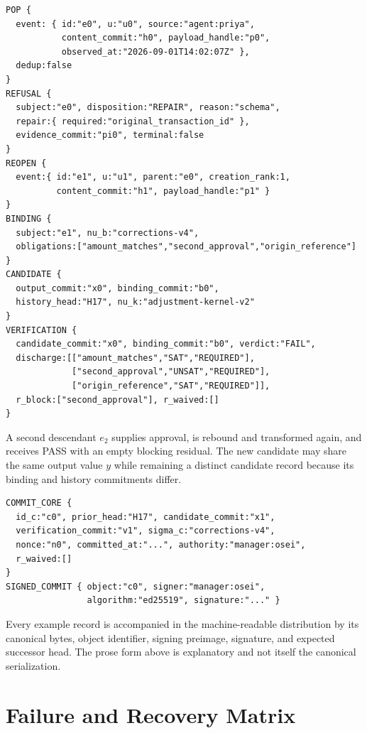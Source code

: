 \documentclass[11pt,openany]{book}
\begin{document}
\begin{scriptsize}
\begin{verbatim}
POP {
  event: { id:"e0", u:"u0", source:"agent:priya",
           content_commit:"h0", payload_handle:"p0",
           observed_at:"2026-09-01T14:02:07Z" },
  dedup:false
}
REFUSAL {
  subject:"e0", disposition:"REPAIR", reason:"schema",
  repair:{ required:"original_transaction_id" },
  evidence_commit:"pi0", terminal:false
}
REOPEN {
  event:{ id:"e1", u:"u1", parent:"e0", creation_rank:1,
          content_commit:"h1", payload_handle:"p1" }
}
BINDING {
  subject:"e1", nu_b:"corrections-v4",
  obligations:["amount_matches","second_approval","origin_reference"]
}
CANDIDATE {
  output_commit:"x0", binding_commit:"b0",
  history_head:"H17", nu_k:"adjustment-kernel-v2"
}
VERIFICATION {
  candidate_commit:"x0", binding_commit:"b0", verdict:"FAIL",
  discharge:[["amount_matches","SAT","REQUIRED"],
             ["second_approval","UNSAT","REQUIRED"],
             ["origin_reference","SAT","REQUIRED"]],
  r_block:["second_approval"], r_waived:[]
}
\end{verbatim}
\end{scriptsize}

A second descendant \(e_2\) supplies approval, is rebound and transformed
again, and receives PASS with an empty blocking residual. The new candidate
may share the same output value \(y\) while remaining a distinct candidate
record because its binding and history commitments differ.

\begin{scriptsize}
\begin{verbatim}
COMMIT_CORE {
  id_c:"c0", prior_head:"H17", candidate_commit:"x1",
  verification_commit:"v1", sigma_c:"corrections-v4",
  nonce:"n0", committed_at:"...", authority:"manager:osei",
  r_waived:[]
}
SIGNED_COMMIT { object:"c0", signer:"manager:osei",
                algorithm:"ed25519", signature:"..." }
\end{verbatim}
\end{scriptsize}

Every example record is accompanied in the machine-readable distribution by
its canonical bytes, object identifier, signing preimage, signature, and
expected successor head. The prose form above is explanatory and not itself
the canonical serialization.

\chapter{Failure and Recovery Matrix}
\end{document}
